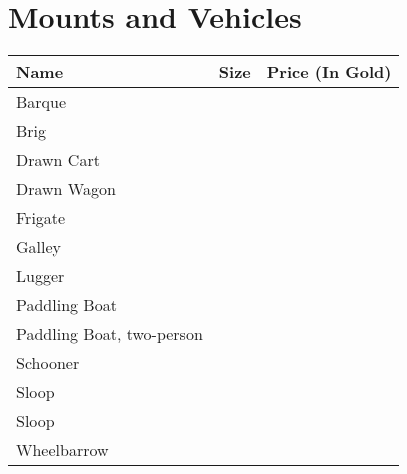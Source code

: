\onecolumn
\section{Mounts and Vehicles}\label{sec:mountsVehicles}
\begin{longtable}{l | r | r}
	Name & Size & Price (In Gold)\\ \hline
	Barque  &  &  \\
	Brig  &  &  \\
	Drawn Cart  &  &  \\
	Drawn Wagon  &  &  \\
	Frigate  &  &  \\
	Galley  &  &  \\
	Lugger  &  &  \\
	Paddling Boat  &  &  \\
	Paddling Boat, two-person  &  &  \\
	Schooner  &  &  \\
	Sloop  &  &  \\
	Sloop  &  &  \\
	Wheelbarrow  &  &  \\
\end{longtable}
